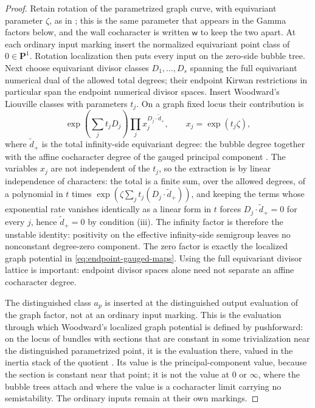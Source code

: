 \begin{proof}
Retain rotation of the parametrized graph curve, with equivariant parameter
\(\zeta\), as in \cite{WoodwardQKIII}; this is the same parameter that
appears in the Gamma factors below, and the wall cocharacter is written
\(\mathsf w\) to keep the two apart.
At each ordinary input marking insert the normalized equivariant
point class of \(0\in\mathbf P^1\).  Rotation localization then puts every
input on the zero-side bubble tree.  Next choose equivariant divisor classes
\(D_1,\ldots,D_s\) spanning the full equivariant numerical dual of the
allowed total degrees; their endpoint Kirwan restrictions in particular span
the endpoint numerical divisor spaces.  Insert Woodward's Liouville classes
with parameters \(t_j\).  On a graph fixed locus their contribution is
\begin{equation}\label{eq:liouville-character}
 \exp\!\left(\sum_jt_jD_j\right)
 \prod_j x_j^{D_j\cdot \widetilde d_+},
 \qquad x_j=\exp(t_j\zeta),
\end{equation}
where \(\widetilde d_+\) is the total infinity-side equivariant degree: the
bubble degree together with the affine cocharacter degree of the gauged
principal component \cite[Corollary~9.10(c)]{WoodwardQKIII}.  The variables
\(x_j\) are not independent of the \(t_j\), so the extraction is by linear
independence of characters: the total is a finite sum, over the allowed
degrees, of a polynomial in \(t\) times
\(\exp(\zeta\sum_jt_j(D_j\cdot\widetilde d_+))\), and keeping the terms whose
exponential rate vanishes identically as a linear form in \(t\) forces
\(D_j\cdot\widetilde d_+=0\) for every \(j\), hence \(\widetilde d_+=0\) by
condition \textup{(iii)}.  The infinity
factor is therefore the unstable identity: positivity on the effective
infinity-side semigroup leaves no nonconstant degree-zero component.  The
zero factor is exactly the localized graph potential in
\eqref{eq:endpoint-gauged-maps}.  Using the
full equivariant divisor lattice is important: endpoint divisor spaces alone
need not separate an affine cocharacter degree.

The distinguished class \(a_p\) is inserted at the distinguished output
evaluation of the graph factor, not at an ordinary input marking.  This is the
evaluation through which Woodward's localized graph potential is defined by
pushforward: on the locus of bundles with sections that are constant in some
trivialization near the distinguished parametrized point, it is the evaluation
there, valued in the inertia stack of the quotient
\cite[Section~9.4]{WoodwardQKIII}.  Its value is the principal-component value,
because the section is constant near that point; it is not the value at
\(0\) or \(\infty\), where the bubble trees attach and where the value is a
cocharacter limit carrying no semistability.
The ordinary inputs remain at their own markings.


\end{proof}
